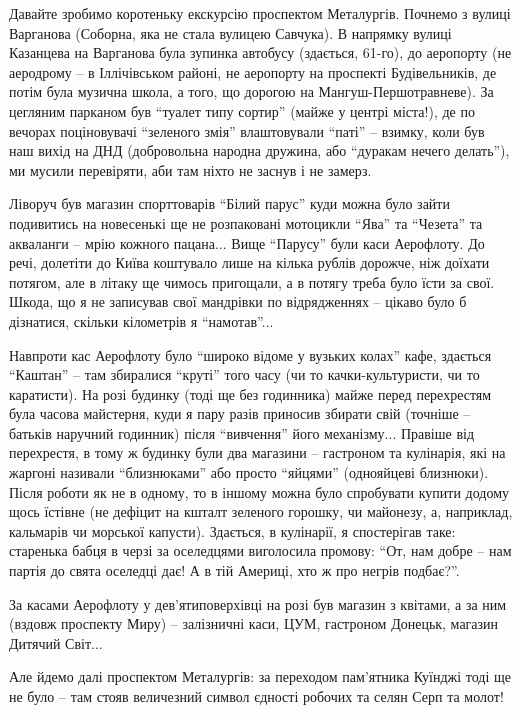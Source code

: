 Давайте зробимо коротеньку екскурсію проспектом Металургів. Почнемо з вулиці
Варганова (Соборна, яка не стала вулицею Савчука). В напрямку вулиці Казанцева
на Варганова була зупинка автобусу (здається, 61-го), до аеропорту (не
аеродрому – в Іллічівськом районі, не аеропорту на проспекті Будівельників, де
потім була музична школа, а того, що дорогою на Мангуш-Першотравневе). За
цегляним парканом був \enquote{туалет типу сортир} (майже у центрі міста!), де по
вечорах поціновувачі \enquote{зеленого змія} влаштовували \enquote{паті} – взимку, коли був наш
вихід на ДНД (добровольна народна дружина, або \enquote{дуракам нечего делать}), ми
мусили перевіряти, аби там ніхто не заснув і не замерз.

 Ліворуч був магазин спорттоварів \enquote{Білий парус} куди можна було зайти
подивитись на новесенькі ще не розпаковані мотоцикли \enquote{Ява} та \enquote{Чезета} та
акваланги – мрію кожного пацана... Вище \enquote{Парусу} були каси Аерофлоту. До речі,
долетіти до Київа коштувало лише на кілька рублів дорожче, ніж доїхати потягом,
але в літаку ще чимось пригощали, а в потягу треба було їсти за свої. Шкода, що
я не записував свої мандрівки по відрядженнях – цікаво було б дізнатися,
скільки кілометрів я \enquote{намотав}...

Навпроти кас Аерофлоту було \enquote{широко відоме у вузьких колах} кафе, здається
\enquote{Каштан} – там збиралися \enquote{круті} того часу (чи то качки-культуристи, чи то
каратисти). На розі будинку (тоді ще без годинника) майже перед перехрестям
була часова майстерня, куди я пару разів приносив збирати свій (точніше –
батьків наручний годинник) після \enquote{вивчення} його механізму... Правіше від
перехрестя, в тому ж будинку були два магазини – гастроном та кулінарія, які на
жаргоні називали \enquote{близнюками} або просто \enquote{яйцями} (однояйцеві близнюки). Після
роботи як не в одному, то в іншому можна було спробувати купити додому щось
їстівне (не дефіцит на кшталт зеленого горошку, чи майонезу, а, наприклад,
кальмарів чи морської капусти). Здається, в кулінарії, я спостерігав таке:
старенька бабця в черзі за оселедцями виголосила промову: \enquote{От, нам добре – нам
партія до свята оселедці дає! А в тій Америці, хто ж про негрів подбає?}.

За касами Аерофлоту у дев'ятиповерхівці на розі був магазин з квітами, а за ним
(вздовж проспекту Миру) – залізничні каси, ЦУМ, гастроном Донецьк, магазин
Дитячий Світ...

Але йдемо далі проспектом Металургів: за переходом пам'ятника Куїнджі тоді ще
не було – там стояв величезний символ єдності робочих та селян Серп та молот!

